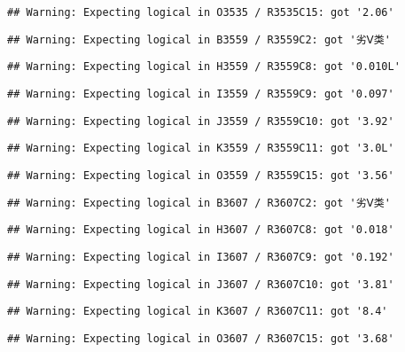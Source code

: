 \documentclass[
]{article}
\begin{document}
\begin{verbatim}
## Warning: Expecting logical in O3535 / R3535C15: got '2.06'
\end{verbatim}

\begin{verbatim}
## Warning: Expecting logical in B3559 / R3559C2: got '劣Ⅴ类'
\end{verbatim}

\begin{verbatim}
## Warning: Expecting logical in H3559 / R3559C8: got '0.010L'
\end{verbatim}

\begin{verbatim}
## Warning: Expecting logical in I3559 / R3559C9: got '0.097'
\end{verbatim}

\begin{verbatim}
## Warning: Expecting logical in J3559 / R3559C10: got '3.92'
\end{verbatim}

\begin{verbatim}
## Warning: Expecting logical in K3559 / R3559C11: got '3.0L'
\end{verbatim}

\begin{verbatim}
## Warning: Expecting logical in O3559 / R3559C15: got '3.56'
\end{verbatim}

\begin{verbatim}
## Warning: Expecting logical in B3607 / R3607C2: got '劣Ⅴ类'
\end{verbatim}

\begin{verbatim}
## Warning: Expecting logical in H3607 / R3607C8: got '0.018'
\end{verbatim}

\begin{verbatim}
## Warning: Expecting logical in I3607 / R3607C9: got '0.192'
\end{verbatim}

\begin{verbatim}
## Warning: Expecting logical in J3607 / R3607C10: got '3.81'
\end{verbatim}

\begin{verbatim}
## Warning: Expecting logical in K3607 / R3607C11: got '8.4'
\end{verbatim}

\begin{verbatim}
## Warning: Expecting logical in O3607 / R3607C15: got '3.68'
\end{verbatim}
\end{document}
